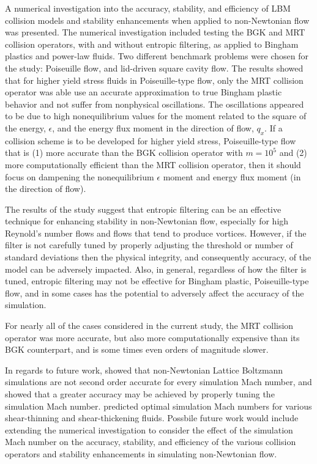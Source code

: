 A numerical investigation into the accuracy, stability, and efficiency of LBM collision models and stability enhancements when applied to non-Newtonian flow was presented.
The numerical investigation included testing the BGK and MRT collision operators, with and without entropic filtering, as applied to Bingham plastics and power-law fluids.
Two different benchmark problems were chosen for the study: Poiseuille flow, and lid-driven square cavity flow.
The results showed that for higher yield stress fluids in Poiseuille-type flow, only the MRT collision operator was able use an accurate approximation to true Bingham plastic behavior and not suffer from nonphysical oscillations.
The oscillations appeared to be due to high nonequilibrium values for the moment related to the square of the energy, $\epsilon$, and the energy flux moment in the direction of flow, $q_x$.
If a collision scheme is to be developed for higher yield stress, Poiseuille-type flow that is (1) more accurate than the BGK collision operator with $m = 10^5$ and (2) more computationally efficient than the MRT collision operator, then it should focus on dampening the nonequilibrium $\epsilon$ moment and energy flux moment (in the direction of flow).

The results of the study suggest that entropic filtering can be an effective technique for enhancing stability in non-Newtonian flow, especially for high Reynold's number flows and flows that tend to produce vortices.
However, if the filter is not carefully tuned by properly adjusting the threshold or number of standard deviations then the physical integrity, and consequently accuracy, of the model can be adversely impacted.
Also, in general, regardless of how the filter is tuned, entropic filtering may not be effective for Bingham plastic, Poiseuille-type flow, and in some cases has the potential to adversely affect the accuracy of the simulation.

For nearly all of the cases considered in the current study, the MRT collision operator was more accurate, but also more computationally expensive than its BGK counterpart, and is some times even orders of magnitude slower.

In regards to future work, \cite{conrad2015accuracy} showed that non-Newtonian Lattice Boltzmann simulations are not second order accurate for every simulation Mach number, and showed that a greater accuracy may be achieved by properly tuning the simulation Mach number.
\cite{conrad2015accuracy} predicted optimal simulation Mach numbers for various shear-thinning and shear-thickening fluids. 
Possbile future work would include extending the numerical investigation to consider the effect of the simulation Mach number on the accuracy, stability, and efficiency of the various collision operators and stability enhancements in simulating non-Newtonian flow.


